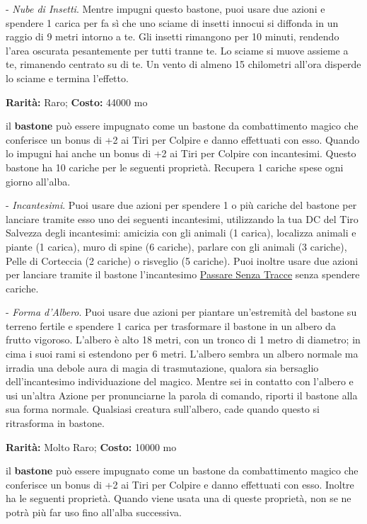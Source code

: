 \begin{multicols}{2}
- \emph{Nube di Insetti}. Mentre impugni questo bastone, puoi usare due azioni e spendere 1 carica per fa sì che uno sciame di insetti innocui si diffonda in un raggio di 9 metri intorno a te. Gli insetti rimangono per 10 minuti, rendendo l'area oscurata pesantemente per tutti tranne te. Lo sciame si muove assieme a te, rimanendo centrato su di te. Un vento di almeno 15 chilometri all'ora disperde lo sciame e termina l'effetto.


\textbf{Rarità:} Raro; \textbf{Costo:} 44000 mo

il \textbf{bastone} può essere impugnato come un bastone da combattimento magico che conferisce un bonus di +2 ai Tiri per Colpire e danno effettuati con esso. Quando lo impugni hai anche un bonus di +2 ai Tiri per Colpire con incantesimi.
Questo bastone ha 10 cariche per le seguenti proprietà. Recupera 1 cariche spese ogni giorno all'alba.

- \emph{Incantesimi}. Puoi usare due azioni per spendere 1 o più cariche del bastone per lanciare tramite esso uno dei seguenti incantesimi, utilizzando la tua DC del Tiro Salvezza degli incantesimi: amicizia con gli animali (1 carica), localizza animali e piante (1 carica), muro di spine (6 cariche), parlare con gli animali (3 cariche), Pelle di Corteccia (2 cariche) o risveglio (5 cariche). Puoi inoltre usare due azioni per lanciare tramite il bastone l'incantesimo \hyperlink{Passare Senza Tracce}{Passare Senza Tracce} senza spendere cariche.

- \emph{Forma d'Albero}. Puoi usare due azioni per piantare un'estremità del bastone su terreno fertile e spendere 1 carica per trasformare il bastone in un albero da frutto vigoroso. L'albero è alto 18 metri, con un tronco di 1 metro di diametro; in cima i suoi rami si estendono per 6 metri. L'albero sembra un albero normale ma irradia una debole aura di magia di trasmutazione, qualora sia bersaglio dell'incantesimo individuazione del magico. Mentre sei in contatto con l'albero e usi un'altra Azione per pronunciarne la parola di comando, riporti il bastone alla sua forma normale. Qualsiasi creatura sull'albero, cade quando questo si ritrasforma in bastone.


\textbf{Rarità:} Molto Raro; \textbf{Costo:} 10000 mo

il \textbf{bastone} può essere impugnato come un bastone da combattimento magico che conferisce un bonus di +2 ai Tiri per Colpire e danno effettuati con esso. Inoltre ha le seguenti proprietà. Quando viene usata una di queste proprietà, non se ne potrà più far uso fino all'alba successiva.


\end{multicols}
